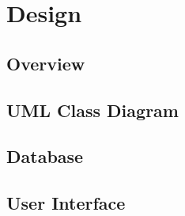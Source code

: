 \section{Design}
\label{sec:Design}

\subsection{Overview} 

\subsection{UML Class Diagram}

\subsection{Database}

\subsection{User Interface}
